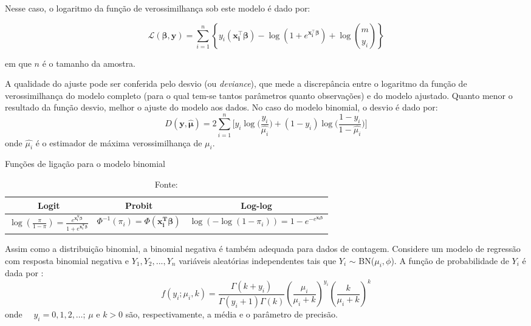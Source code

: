 \documentclass[12pt, a4paper, twoside]{report}
\numberwithin{equation}{section} %
\begin{document}
Nesse caso, o logaritmo da função de verossimilhança sob este modelo é dado por:

\begin{equation}\label{ll_binom}
\mathcal{L}(\boldsymbol{\beta},\boldsymbol{y}) = \sum\limits_{i=1}^{n}\left\{ y_i (\boldsymbol{x_i^\top \beta}) - \log{(1 + e^{\boldsymbol{x_i^\top \beta}})+\log\binom{m}{y_i}} \right\}
\end{equation}

em que $n$ é o tamanho da amostra.

A qualidade do ajuste pode ser conferida pelo desvio (ou \textit{deviance}), que mede a discrepância entre o logaritmo da função de verossimilhança do modelo completo (para o qual tem-se tantos parâmetros quanto observações) e do modelo ajustado. Quanto menor o resultado da função desvio, melhor o ajuste do modelo aos dados. No caso do modelo binomial, o desvio é dado por:
\begin{equation}\label{dev_binom}
D(\boldsymbol{y},\boldsymbol{\hat{\mu}})=2 \sum\limits_{i=1}^{n} \biggl[y_i \log{\biggl( \frac{y_i}{\hat{\mu_i}}} \biggl)+(1-y_i) \log \biggl( \frac{1-y_i}{1-\hat{\mu_i}} \biggl) \biggl]
\end{equation}
onde $\hat{\mu_i}$ é o estimador de máxima verossimilhança de $\mu_i$. 

\begin{table}[h]
\centering
\footnotesize
\caption{Funções de ligação para o modelo binomial}
\begin{tabular}{c|c|c} 
\hline
\textbf{Logit} & \textbf{Probit} & \textbf{Log-log}  \\ 
\hline
$\log{\left(\frac{\pi}{1-\pi}\right)}=\frac{e^{\boldsymbol{x_i^T\beta}}}{1+e^{\boldsymbol{x_i^T\beta}}}$ & $\Phi^{-1}(\pi_i)=\Phi(\boldsymbol{x_i^T\beta})$ & $\log{(-\log{(1-\pi_i)})}=1-e^{-e^{\boldsymbol{x_i\beta}}}$ \\ 
\hline
\end{tabular}
\caption*{\footnotesize Fonte: \cite{sousa2022}}
\label{tab:fligacao_binom}
\end{table}

Assim como a distribuição binomial, a binomial negativa é também adequada para dados de contagem. Considere um modelo de regressão com resposta binomial negativa e $Y_{1},Y_{2},...,Y_{n}$ variáveis aleatórias independentes tais que $Y_{i}$ $\sim$ BN($\mu_{i}, \phi$). A função de probabilidade de $Y_{i}$ é dada por \citep{paula2004modelos}:
\begin{equation}\label{fp_bn}
f(y_i; \mu_i, k) = \frac{\Gamma(k + y_i)}{\Gamma(y_i + 1) \Gamma(k)} \left( \frac{\mu_i}{\mu_i + k} \right)^{y_i} \left( \frac{k}{\mu_i + k} \right)^{k}
\end{equation}
onde $\quad y_i = 0, 1, 2, \ldots$; $\mu$ e $k>0$ são, respectivamente, a média e o parâmetro de precisão.
\end{document}
